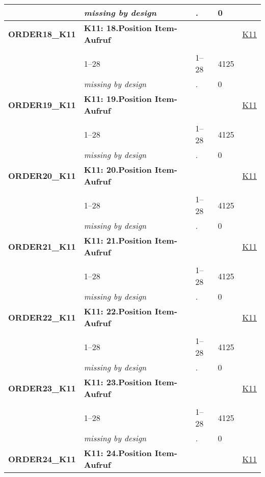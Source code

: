 \begin{longtable}{| L{2.65cm} | L{8cm} | C{1.5cm} | R{1.25cm} | C{2.25cm}  |}
   & \textit{missing by design} & \textit{.} & 0 &  \\ 
   \midrule
\textbf{ORDER18\_K11}\label{var:ORDER18:K11} & \textbf{K11: 18.Position Item-Aufruf} &  &  & \hyperref[K11]{K11} \\ 
   &  &  &  &  \\ 
   & 1--28 & 1--28 & 4125 &  \\ 
   & \textit{missing by design} & \textit{.} & 0 &  \\ 
   \midrule
\textbf{ORDER19\_K11}\label{var:ORDER19:K11} & \textbf{K11: 19.Position Item-Aufruf} &  &  & \hyperref[K11]{K11} \\ 
   &  &  &  &  \\ 
   & 1--28 & 1--28 & 4125 &  \\ 
   & \textit{missing by design} & \textit{.} & 0 &  \\ 
   \midrule
\textbf{ORDER20\_K11}\label{var:ORDER20:K11} & \textbf{K11: 20.Position Item-Aufruf} &  &  & \hyperref[K11]{K11} \\ 
   &  &  &  &  \\ 
   & 1--28 & 1--28 & 4125 &  \\ 
   & \textit{missing by design} & \textit{.} & 0 &  \\ 
   \midrule
\textbf{ORDER21\_K11}\label{var:ORDER21:K11} & \textbf{K11: 21.Position Item-Aufruf} &  &  & \hyperref[K11]{K11} \\ 
   &  &  &  &  \\ 
   & 1--28 & 1--28 & 4125 &  \\ 
   & \textit{missing by design} & \textit{.} & 0 &  \\ 
   \midrule
\textbf{ORDER22\_K11}\label{var:ORDER22:K11} & \textbf{K11: 22.Position Item-Aufruf} &  &  & \hyperref[K11]{K11} \\ 
   &  &  &  &  \\ 
   & 1--28 & 1--28 & 4125 &  \\ 
   & \textit{missing by design} & \textit{.} & 0 &  \\ 
   \midrule
\textbf{ORDER23\_K11}\label{var:ORDER23:K11} & \textbf{K11: 23.Position Item-Aufruf} &  &  & \hyperref[K11]{K11} \\ 
   &  &  &  &  \\ 
   & 1--28 & 1--28 & 4125 &  \\ 
   & \textit{missing by design} & \textit{.} & 0 &  \\ 
   \midrule
\textbf{ORDER24\_K11}\label{var:ORDER24:K11} & \textbf{K11: 24.Position Item-Aufruf} &  &  & \hyperref[K11]{K11} \\ 

\end{longtable}
